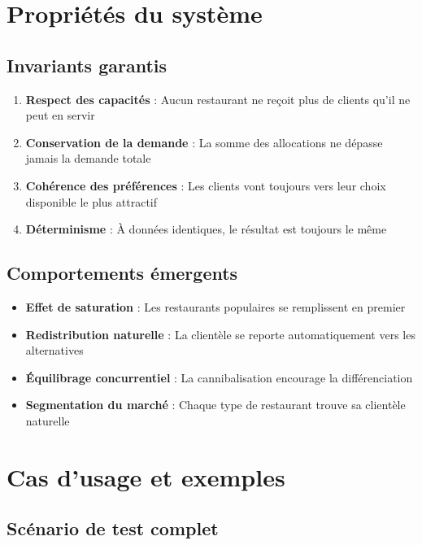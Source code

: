 \documentclass[12pt,a4paper]{article}
\begin{document}
\section{Propriétés du système}

\subsection{Invariants garantis}

\begin{enumerate}
    \item \textbf{Respect des capacités} : Aucun restaurant ne reçoit plus de clients qu'il ne peut en servir
    \item \textbf{Conservation de la demande} : La somme des allocations ne dépasse jamais la demande totale
    \item \textbf{Cohérence des préférences} : Les clients vont toujours vers leur choix disponible le plus attractif
    \item \textbf{Déterminisme} : À données identiques, le résultat est toujours le même
\end{enumerate}

\subsection{Comportements émergents}

\begin{itemize}
    \item \textbf{Effet de saturation} : Les restaurants populaires se remplissent en premier
    \item \textbf{Redistribution naturelle} : La clientèle se reporte automatiquement vers les alternatives
    \item \textbf{Équilibrage concurrentiel} : La cannibalisation encourage la différenciation
    \item \textbf{Segmentation du marché} : Chaque type de restaurant trouve sa clientèle naturelle
\end{itemize}

\section{Cas d'usage et exemples}

\subsection{Scénario de test complet}
\end{document}
